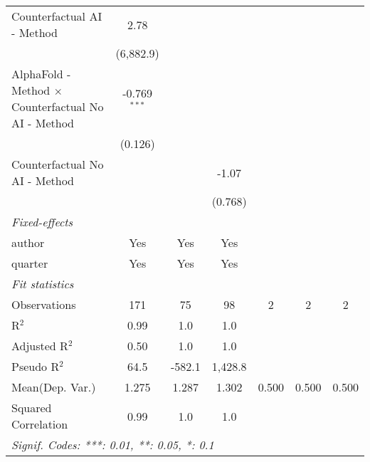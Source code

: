 \begin{tabular}{lcccccc}
   Counterfactual AI - Method                                 & 2.78           &               &                &     &     &   \\   
                                                              & (6,882.9)      &               &                &     &     &   \\   
   AlphaFold - Method $\times$ Counterfactual No AI - Method  & -0.769$^{***}$ &               &                &     &     &   \\   
                                                              & (0.126)        &               &                &     &     &   \\   
   Counterfactual No AI - Method                              &                &               & -1.07          &     &     &   \\   
                                                              &                &               & (0.768)        &     &     &   \\   
   \midrule
   \emph{Fixed-effects}\\
   author                                                     & Yes            & Yes           & Yes            &     &     & \\  
   quarter                                                    & Yes            & Yes           & Yes            &     &     & \\  
   \midrule
   \emph{Fit statistics}\\
   Observations                                               & 171            & 75            & 98             & 2   & 2   & 2\\  
   R$^2$                                                      & 0.99           & 1.0           & 1.0            &     &     & \\  
   Adjusted R$^2$                                             & 0.50           & 1.0           & 1.0            &     &     & \\  
   Pseudo R$^2$                                               & 64.5           & -582.1        & 1,428.8        &     &     & \\  
Mean(Dep. Var.) & 1.275 & 1.287 & 1.302 & 0.500 & 0.500 & 0.500 \\
   Squared Correlation                                        & 0.99           & 1.0           & 1.0            &     &     & \\  
   \midrule \midrule
   \multicolumn{7}{l}{\emph{Signif. Codes: ***: 0.01, **: 0.05, *: 0.1}}\\
\end{tabular}
\par\endgroup
